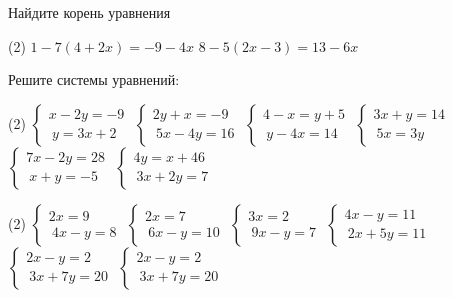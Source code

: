 \begin{class}[number=4]
	\begin{listofex}
		\item Найдите корень уравнения \begin{tasks}(2)
			\task \( 1-7(4+2x)= -9-4x \)
			\task \( 8-5(2x-3)=13-6x \)
		\end{tasks}
		\item Решите системы уравнений:
		\begin{tasks}(2)
			\task \( \begin{cases}
				x-2y=-9\\\ y=3x+2
			\end{cases} \)
			\task \( \begin{cases}
				2y+x=-9\\\ 5x-4y=16
			\end{cases} \)
			\task \( \begin{cases}
				4-x=y+5\\\ y-4x=14
			\end{cases} \)
			\task \( \begin{cases}
				3x+y=14\\\ 5x=3y
			\end{cases} \)
			\task \( \begin{cases}
				7x-2y=28 \\\ x+y=-5
			\end{cases} \)
			\task \( \begin{cases}
				4y=x+46 \\\ 3x+2y=7
			\end{cases} \)
		\end{tasks}
		\item \begin{tasks}(2)
			\task \( \begin{cases}
				2x=9 \\\
				4x-y=8
			\end{cases} \)
			\task \( \begin{cases}
				2x=7\\\
				6x-y=10
			\end{cases} \)
			\task \( \begin{cases}
				3x=2\\\
				9x-y=7
			\end{cases} \)
			\task \( \begin{cases}
				4x-y=11\\\
				2x+5y=11
			\end{cases} \)
			\task \( \begin{cases}
				2x-y=2\\\
				3x+7y=20
			\end{cases} \)
			\task \( \begin{cases}
				2x-y=2\\\
				3x+7y=20
			\end{cases} \)
			
		\end{tasks}
		
	\end{listofex}
\end{class}

